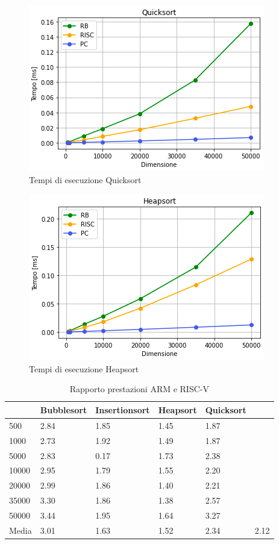 \documentclass[12pt, a4paper]{report}
\begin{document}
\begin{figure}[ht]
\centering
 \includegraphics[scale=0.8]{Img/GraficiSorting/Quicksort_All.PNG}
 \caption{Tempi di esecuzione Quicksort}
\end{figure}

\begin{figure}[ht]
\centering
 \includegraphics[scale=0.8]{Img/GraficiSorting/Heapsort_All}
 \caption{Tempi di esecuzione Heapsort}
\end{figure}


\begin{table}[ht]
\centering
\begin{tabular}{|l|l|l|l|l|l|}
\hline
      & Bubblesort & Insertionsort & Heapsort & Quicksort &      \\ \hline
500   & 2.84       & 1.85          & 1.45     & 1.87      &      \\ \hline
1000  & 2.73       & 1.92          & 1.49     & 1.87      &      \\ \hline
5000  & 2.83       & 0.17          & 1.73     & 2.38      &      \\ \hline
10000 & 2.95       & 1.79          & 1.55     & 2.20      &      \\ \hline
20000 & 2.99       & 1.86          & 1.40     & 2.21      &      \\ \hline
35000 & 3.30       & 1.86          & 1.38     & 2.57      &      \\ \hline
50000 & 3.44       & 1.95          & 1.64     & 3.27      &      \\ \hline
Media & 3.01       & 1.63          & 1.52     & 2.34      & 2.12 \\ \hline
\end{tabular}
\caption{Rapporto prestazioni ARM e RISC-V}
\label{Tab:confrontoPrestazioniSorting}
\end{table}
\end{document}
